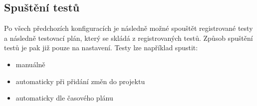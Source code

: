 \subsection{Spuštění testů}
Po všech předchozích konfiguracích je následně možné spouštět registrované testy a následně testovací plán, který se skládá z registrovaných testů. Způsob spuštění testů je pak již pouze na nastavení. Testy lze například spustit:

\begin{itemize}
    \item manuálně
    \item automaticky při přidání změn do projektu
    \item automaticky dle časového plánu
\end{itemize}


